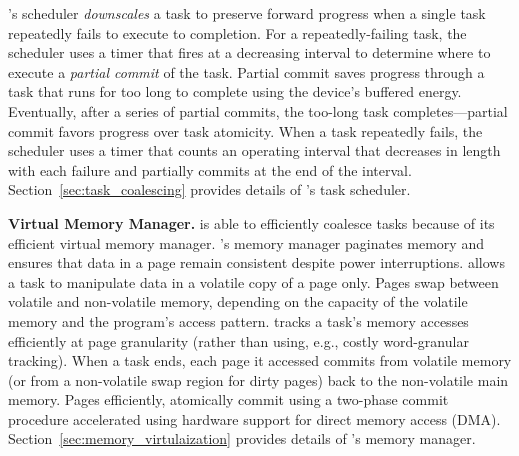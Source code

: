 \sys's scheduler {\em downscales} a task to preserve forward progress when a
single task repeatedly fails to execute to completion.  For a repeatedly-failing
task, the scheduler uses a timer that fires at a decreasing interval to
determine where to execute a {\em partial commit} of the task. Partial
commit saves progress through a task that runs for too long to complete
using the device's buffered energy. Eventually, after a series of partial
commits, the too-long task completes---partial commit favors progress over task atomicity.  
When a task repeatedly fails, the scheduler uses a timer that counts an operating interval
that decreases in length with each failure and \sys partially commits at the end of the interval. 
Section~\ref{sec:task_coalescing} provides details of \sys's task scheduler.

\textbf{\sys Virtual Memory Manager.} \sys is able to efficiently coalesce
tasks because of its efficient virtual memory manager. \sys's memory manager
paginates memory and ensures that data in a page remain consistent despite
power interruptions. \sys allows a task to manipulate data in a volatile copy
of a page only. Pages swap between volatile and non-volatile memory, depending
on the capacity of the volatile memory and the program's access pattern. \sys
tracks a task's memory accesses efficiently at page granularity (rather than
using, e.g., costly word-granular tracking). When a task ends, each page it
accessed commits from volatile memory (or from a non-volatile swap region for
dirty pages) back to the non-volatile main memory. Pages efficiently,
atomically commit using a two-phase commit procedure accelerated using hardware
support for direct memory access (DMA). Section~\ref{sec:memory_virtulaization}
provides details of \sys's memory manager.
